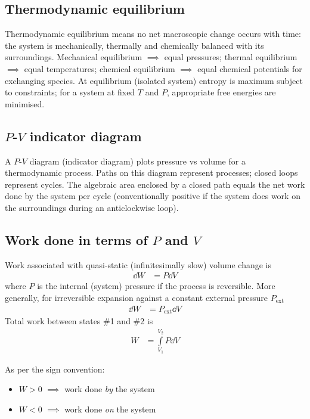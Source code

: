 	\subsection{Thermodynamic equilibrium}
		Thermodynamic equilibrium means no net macroscopic change occurs with time: the system is mechanically, thermally and chemically balanced with its surroundings. Mechanical equilibrium $\implies$ equal pressures; thermal equilibrium $\implies$ equal temperatures; chemical equilibrium $\implies$ equal chemical potentials for exchanging species. At equilibrium (isolated system) entropy is maximum subject to constraints; for a system at fixed $T$ and $P$, appropriate free energies are minimised.
		
	\subsection{$P$-$V$ indicator diagram}
		A $P$-$V$ diagram (indicator diagram) plots pressure vs volume for a thermodynamic process. Paths on this diagram represent processes; closed loops represent cycles. The algebraic area enclosed by a closed path equals the net work done by the system per cycle (conventionally positive if the system does work on the surroundings during an anticlockwise loop).
		
	\subsection{Work done in terms of $P$ and $V$}
		Work associated with quasi-static (infinitesimally slow) volume change is
		\begin{align*}
			\dd{W}&=P\dd{V}
		\end{align*}
		where $P$ is the internal (system) pressure if the process is reversible. More generally, for irreversible expansion against a constant external pressure $P_\text{ext}$
		\begin{align*}
			\dd{W}&=P_\text{ext}\dd{V}
		\end{align*}
		Total work between states \#1 and \#2 is
		\begin{align*}
			W&=\int\limits_{V_1}^{V_2}{P\dd{V}}
		\end{align*}
		
		As per the sign convention:
		\begin{itemize}
			\item $W>0$ $\implies$ work done \emph{by} the system
			\item $W<0$ $\implies$ work done \emph{on} the system
		\end{itemize}
		
